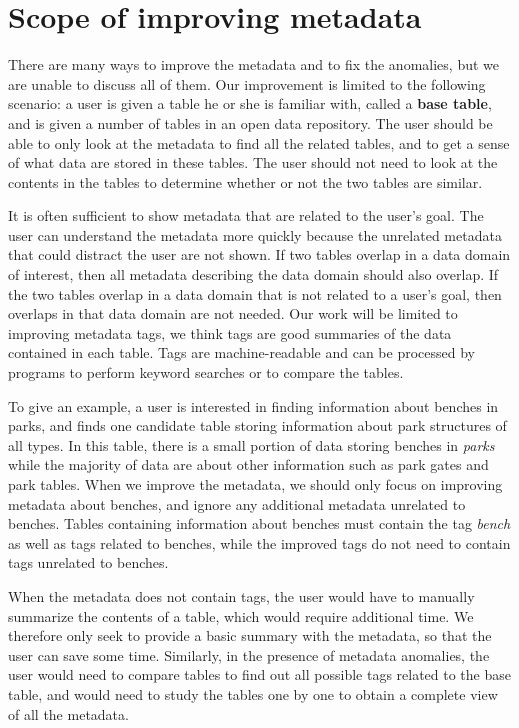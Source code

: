 \section{Scope of improving metadata}
\label{sec:ScopeOfImprovingMetadata}

There are many ways to improve the metadata and to fix the anomalies, but we are unable to discuss all of them. Our improvement is limited to the following scenario: a user is given a table he or she is familiar with, called a \textbf{\gls{base table}}, and is given a number of tables in an open data repository. The user should be able to only look at the metadata to find all the related tables, and to get a sense of what data are stored in these tables. The user should not need to look at the contents in the tables to determine whether or not the two tables are similar.

It is often sufficient to show metadata that are related to the user's goal. The user can understand the metadata more quickly because the unrelated metadata that could distract the user are not shown. If two tables overlap in a data domain of interest, then all metadata describing the data domain should also overlap. If the two tables overlap in a data domain that is not related to a user's goal, then overlaps in that data domain are not needed. Our work will be limited to improving metadata tags, we think tags are good summaries of the data contained in each table. Tags are machine-readable and can be processed by programs to perform keyword searches or to compare the tables.

To give an example, a user is interested in finding information about benches in parks, and finds one candidate table storing information about park structures of all types. In this table, there is a small portion of data storing benches in \textit{parks} while the majority of data are about other information such as park gates and park tables. When we improve the metadata, we should only focus on improving metadata about benches, and ignore any additional metadata unrelated to benches. Tables containing information about benches must contain the tag \textit{bench} as well as tags related to benches, while the improved tags do not need to contain tags unrelated to benches.

When the metadata does not contain tags, the user would have to manually summarize the contents of a table, which would require additional time. We therefore only seek to provide a basic summary with the metadata, so that the user can save some time. Similarly, in the presence of metadata anomalies, the user would need to compare tables to find out all possible tags related to the base table, and would need to study the tables one by one to obtain a complete view of all the metadata.

